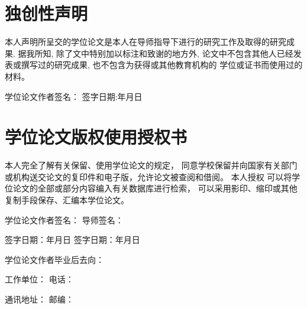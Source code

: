 \documentclass[12pt]{ctexart}
\numberwithin{equation}{section}
\numberwithin{figure}{section}
\begin{document}


\tableofcontents



\renewcommand{\leftmark}{结论}

\begin{spacing}{1}
  \printbibliography[heading=bibliography,title=参考文献]
\end{spacing}




\section*{独创性声明}

本人声明所呈交的学位论文是本人在导师指导下进行的研究工作及取得的研究成果.
据我所知, 除了文中特别加以标注和致谢的地方外,
论文中不包含其他人已经发表或撰写过的研究成果,
也不包含为获得\underline{}或其他教育机构的
学位或证书而使用过的材料。

\vspace{1cm} \noindent 学位论文作者签名： \hspace{11\ccwd}
签字日期:\hspace{2\ccwd}年\hspace{1\ccwd}月\hspace{1\ccwd}日
\vspace{1cm}

\section*{学位论文版权使用授权书}
本人完全了解\underline{}有关保留、使用学位论文的规定，
同意学校保留并向国家有关部门或机构送交论文的复印件和电子版，允许论文被查阅和借阅。
本人授权\underline{}
可以将学位论文的全部或部分内容编入有关数据库进行检索，
可以采用影印、缩印或其他复制手段保存、汇编本学位论文。

\vspace{1cm}
\noindent 学位论文作者签名： \hspace{11\ccwd} 导师签名：

\noindent 签字日期：\hspace{2\ccwd}年\hspace{1\ccwd}月\hspace{1\ccwd}日
\hspace{7.7\ccwd}
签字日期：\hspace{2\ccwd}年\hspace{1\ccwd}月\hspace{1\ccwd}日

\vspace{1cm}
\noindent 学位论文作者毕业后去向：

\noindent 工作单位：\hspace{15.3\ccwd} 电话：

\noindent 通讯地址：\hspace{15.3\ccwd} 邮编：
\end{document}
